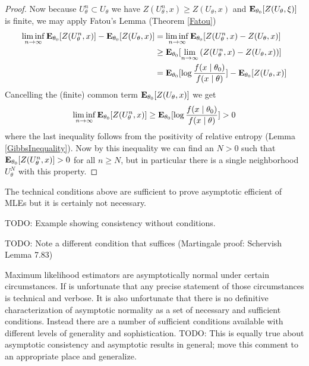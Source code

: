 \begin{proof}
Now because $U^n_\theta \subset U_\theta$ we have $Z(U^n_\theta, x)
\geq Z(U_\theta, x)$ and $\sexpectation{Z(U_\theta, \xi)}{\theta_0}$
is finite, we may apply Fatou's Lemma (Theorem
\ref{Fatou})
\begin{align*}
\liminf_{n \to \infty} \sexpectation{ Z(U^n_\theta, x)}{\theta_0} -
\sexpectation{Z(U_\theta, x)}{\theta_0} &= \liminf_{n \to \infty} \sexpectation{ Z(U^n_\theta, x) - Z(U_\theta,
x)}{\theta_0} \\
&\geq \sexpectation{ \lim_{n \to \infty}  \left (Z(U^n_\theta, x) - Z(U_\theta,
x) \right )}{\theta_0} \\
&=\sexpectation{ \log \frac{f(x \mid \theta_0)}{f(x \mid
  \theta)}}{\theta_0} -
\sexpectation{Z(U_\theta, x)}{\theta_0} 
\end{align*}
Cancelling the (finite) common term $\sexpectation{Z(U_\theta, x)}{\theta_0}$ we get
\begin{align*}
\liminf_{n \to \infty} \sexpectation{ Z(U^n_\theta, x)}{\theta_0} \geq \sexpectation{ \log \frac{f(x \mid \theta_0)}{f(x \mid
  \theta)}}{\theta_0}  > 0
\end{align*}
where the last inequality follows from the positivity of relative
entropy (Lemma \ref{GibbsInequality}).  Now by this inequality we can
find an $N >0$ such that $\sexpectation{ Z(U^n_\theta, x)}{\theta_0} >
0$ for all $n \geq N$, but in particular there is a single
neighborhood $U^N_\theta$ with this property.  
\end{proof}
The technical conditions above are sufficient to prove asymptotic
efficient of MLEs but it is certainly not necessary.

TODO: Example showing consistency without conditions.

TODO: Note a different condition that suffices (Martingale proof:
Schervish Lemma 7.83)

Maximum likelihood estimators are asymptotically normal under certain
circumstances.  If is unfortunate that any precise statement of those
circumstances is technical and verbose.  It is also unfortunate that
there is no definitive characterization of asymptotic normality as a
set of necessary and sufficient conditions.  Instead there are a
number of sufficient conditions available with different levels of
generality and sophistication.  TODO: This is equally true about
asymptotic consistency and asymptotic results in general; move this
comment to an appropriate place and generalize.

